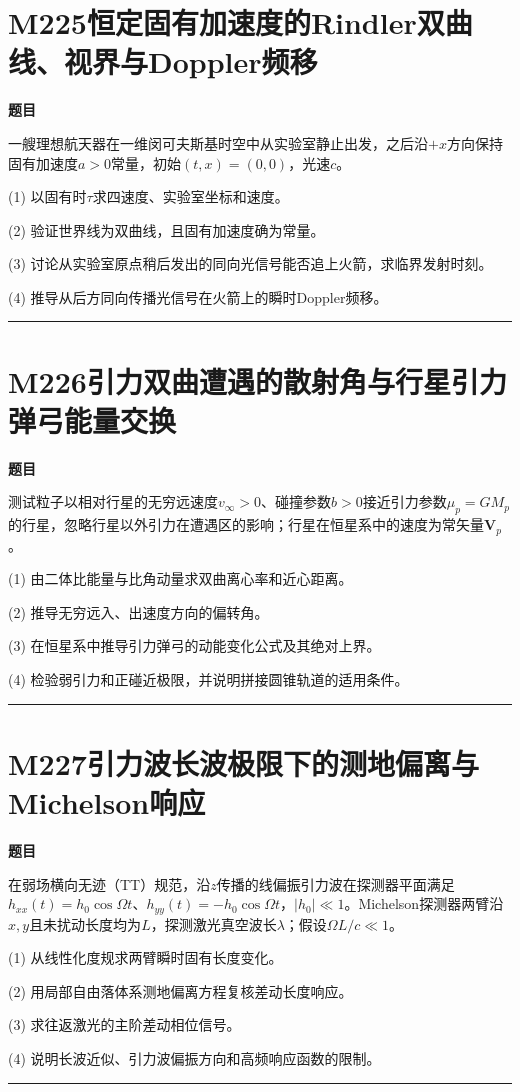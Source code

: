 \documentclass[UTF8,a4paper,11pt,oneside,openany]{ctexbook}
\begin{document}
\section*{M225\quad 恒定固有加速度的Rindler双曲线、视界与Doppler频移}
\textbf{题目}\par
一艘理想航天器在一维闵可夫斯基时空中从实验室静止出发，之后沿$+x$方向保持固有加速度$a>0$常量，初始$(t,x)=(0,0)$，光速$c$。
\par\smallskip\noindent (1) 以固有时$\tau$求四速度、实验室坐标和速度。
\par\smallskip\noindent (2) 验证世界线为双曲线，且固有加速度确为常量。
\par\smallskip\noindent (3) 讨论从实验室原点稍后发出的同向光信号能否追上火箭，求临界发射时刻。
\par\smallskip\noindent (4) 推导从后方同向传播光信号在火箭上的瞬时Doppler频移。
\par\medskip\hrule\medskip
\section*{M226\quad 引力双曲遭遇的散射角与行星引力弹弓能量交换}
\textbf{题目}\par
测试粒子以相对行星的无穷远速度$v_\infty>0$、碰撞参数$b>0$接近引力参数$\mu_p=GM_p$的行星，忽略行星以外引力在遭遇区的影响；行星在恒星系中的速度为常矢量$\boldsymbol V_p$。
\par\smallskip\noindent (1) 由二体比能量与比角动量求双曲离心率和近心距离。
\par\smallskip\noindent (2) 推导无穷远入、出速度方向的偏转角。
\par\smallskip\noindent (3) 在恒星系中推导引力弹弓的动能变化公式及其绝对上界。
\par\smallskip\noindent (4) 检验弱引力和正碰近极限，并说明拼接圆锥轨道的适用条件。
\par\medskip\hrule\medskip
\section*{M227\quad 引力波长波极限下的测地偏离与Michelson响应}
\textbf{题目}\par
在弱场横向无迹（TT）规范，沿$z$传播的线偏振引力波在探测器平面满足$h_{xx}(t)=h_0\cos\Omega t$、$h_{yy}(t)=-h_0\cos\Omega t$，$|h_0|\ll1$。Michelson探测器两臂沿$x,y$且未扰动长度均为$L$，探测激光真空波长$\lambda$；假设$\Omega L/c\ll1$。
\par\smallskip\noindent (1) 从线性化度规求两臂瞬时固有长度变化。
\par\smallskip\noindent (2) 用局部自由落体系测地偏离方程复核差动长度响应。
\par\smallskip\noindent (3) 求往返激光的主阶差动相位信号。
\par\smallskip\noindent (4) 说明长波近似、引力波偏振方向和高频响应函数的限制。
\par\medskip\hrule\medskip
\end{document}
